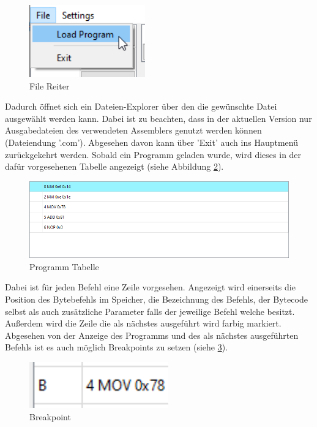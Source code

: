 \documentclass[12pt]{article}
\begin{document}
\begin{figure}[h]
\centering
\includegraphics[width=5cm]{bilder/LoadFile}
\caption{File Reiter}
\label{fig:LoadFile}
\end{figure}

\noindent
Dadurch öffnet sich ein Dateien-Explorer über den die gewünschte Datei ausgewählt werden kann. Dabei ist zu beachten, dass in der aktuellen Version nur Ausgabedateien des verwendeten Assemblers genutzt werden können (Dateiendung '.com'). Abgesehen davon kann über 'Exit' auch ins Hauptmenü zurückgekehrt werden. Sobald ein Programm geladen wurde, wird dieses in der dafür vorgesehenen Tabelle angezeigt (siehe Abbildung \ref{fig:ProgTable}).\vspace{10pt}

\begin{figure}[h]
\centering
\includegraphics[width=15cm]{bilder/Program_table}
\caption{Programm Tabelle}
\label{fig:ProgTable}
\end{figure}

\noindent
Dabei ist für jeden Befehl eine Zeile vorgesehen. Angezeigt wird einerseits die Position des Bytebefehls im Speicher, die Bezeichnung des Befehls, der Bytecode selbst als auch zusätzliche Parameter falls der jeweilige Befehl welche besitzt. Außerdem wird die Zeile die als nächstes ausgeführt wird farbig markiert. Abgesehen von der Anzeige des Programms und des als nächstes ausgeführten Befehls ist es auch möglich Breakpoints zu setzen (siehe \ref{fig:Break}).\vspace{10pt}

\begin{figure}[h]
\centering
\includegraphics[width=6cm]{bilder/Breakpoint}
\caption{Breakpoint}
\label{fig:Break}
\end{figure}
\end{document}
